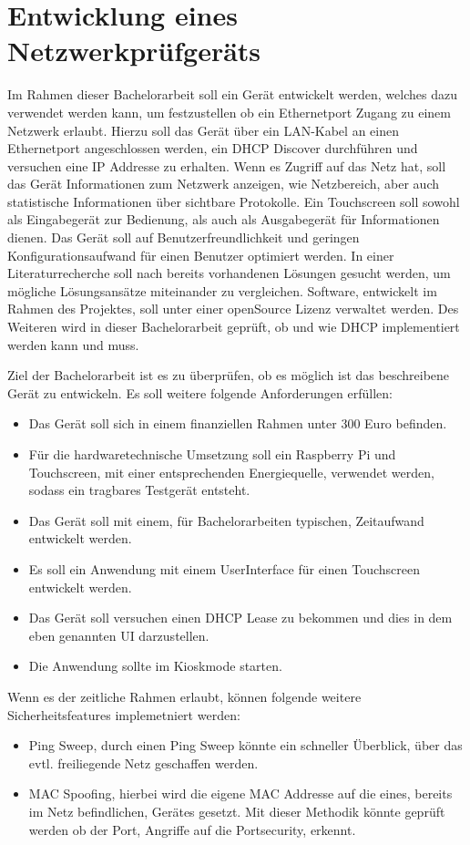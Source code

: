 \documentclass{report}
\begin{document}
\chapter*{Entwicklung eines Netzwerkprüfgeräts}

Im Rahmen dieser Bachelorarbeit soll ein Gerät entwickelt werden, welches dazu verwendet werden kann, um festzustellen ob ein Ethernetport Zugang zu einem Netzwerk erlaubt. Hierzu soll das Gerät über ein LAN-Kabel an einen Ethernetport angeschlossen werden, ein DHCP Discover durchführen und versuchen eine IP Addresse zu erhalten.  
Wenn es Zugriff auf das Netz hat, soll das Gerät Informationen zum Netzwerk anzeigen, wie Netzbereich, aber auch statistische Informationen über sichtbare Protokolle.  
Ein Touchscreen soll sowohl als Eingabegerät zur Bedienung, als auch als Ausgabegerät für Informationen dienen.  
Das Gerät soll auf Benutzerfreundlichkeit und geringen Konfigurationsaufwand für einen Benutzer optimiert werden.  
In einer Literaturrecherche soll nach bereits vorhandenen Lösungen gesucht werden, um mögliche Lösungsansätze miteinander zu vergleichen.  
Software, entwickelt im Rahmen des Projektes, soll unter einer openSource Lizenz verwaltet werden.
Des Weiteren wird in dieser Bachelorarbeit geprüft, ob und wie DHCP implementiert werden kann und muss. 

Ziel der Bachelorarbeit ist es zu überprüfen, ob es möglich ist das beschreibene Gerät zu entwickeln. Es soll weitere folgende Anforderungen erfüllen:  
\begin{itemize}
\item Das Gerät soll sich in einem finanziellen Rahmen unter 300 Euro befinden.  
\item Für die hardwaretechnische Umsetzung soll ein Raspberry Pi und Touchscreen, mit einer entsprechenden Energiequelle, verwendet werden, sodass ein tragbares Testgerät entsteht.  
\item Das Gerät soll mit einem, für Bachelorarbeiten typischen, Zeitaufwand entwickelt werden.  
\item Es soll ein Anwendung mit einem UserInterface für einen Touchscreen entwickelt werden.  
\item Das Gerät soll versuchen einen DHCP Lease zu bekommen und dies in dem eben genannten UI darzustellen.  
\item Die Anwendung sollte im Kioskmode starten.  
\end{itemize}

Wenn es der zeitliche Rahmen erlaubt, können folgende weitere Sicherheitsfeatures implemetniert werden:  
\begin{itemize}
\item Ping Sweep, durch einen Ping Sweep könnte ein schneller Überblick, über das evtl. freiliegende Netz geschaffen werden.  
\item MAC Spoofing, hierbei wird die eigene MAC Addresse auf die eines, bereits im Netz befindlichen, Gerätes gesetzt. Mit dieser Methodik könnte geprüft werden ob der Port, Angriffe auf die Portsecurity, erkennt.
\end{itemize}
\end{document}
